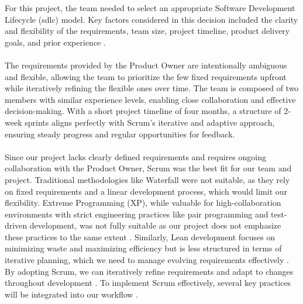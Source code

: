 For this project, the team needed to select an appropriate Software Development Lifecycle (\acrshort{sdlc}) model. Key factors considered in this decision included the clarity and flexibility of the requirements, team size, project timeline, product delivery goals, and prior experience \cite{sdlc_model}. 
\\ \\
The requirements provided by the Product Owner are intentionally ambiguous and flexible, allowing the team to prioritize the few fixed requirements upfront while iteratively refining the flexible ones over time. The team is composed of two members with similar experience levels, enabling close collaboration and effective decision-making. With a short project timeline of four months, a structure of 2-week sprints aligns perfectly with Scrum's iterative and adaptive approach, ensuring steady progress and regular opportunities for feedback. 
\\ \\
Since our project lacks clearly defined requirements and requires ongoing collaboration with the Product Owner, Scrum was the best fit for our team and project. Traditional methodologies like Waterfall were not suitable, as they rely on fixed requirements and a linear development process, which would limit our flexibility. Extreme Programming (XP), while valuable for high-collaboration environments with strict engineering practices like pair programming and test-driven development, was not fully suitable as our project does not emphasize these practices to the same extent \cite{extreme_programming}. Similarly, Lean development focuses on minimizing waste and maximizing efficiency but is less structured in terms of iterative planning, which we need to manage evolving requirements effectively \cite{lean_programming}. By adopting Scrum, we can iteratively refine requirements and adapt to changes throughout development \cite{sdlc_model}. To implement Scrum effectively, several key practices will be integrated into our workflow \cite{scrum_guide}.

